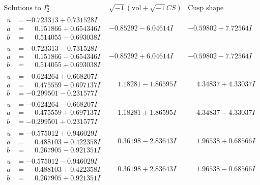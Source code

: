 \documentclass[1p]{elsarticle_modified}
\theoremstyle{definition}
\newcommand{\I}{\sqrt{-1}}
\begin{document}
$$\begin{array}{c|c|c}  
\text{Solutions to }I^u_{2}& \I (\text{vol} + \sqrt{-1}CS) & \text{Cusp shape}\\
 \hline 
\begin{aligned}
u &= -0.723313 + 0.731528 I \\
a &= \phantom{-}0.151866 + 0.654346 I \\
b &= \phantom{-}0.514055 - 0.693038 I\end{aligned}
 & -0.85292 - 6.04614 I & -0.59802 + 7.72564 I \\ \hline\begin{aligned}
u &= -0.723313 - 0.731528 I \\
a &= \phantom{-}0.151866 - 0.654346 I \\
b &= \phantom{-}0.514055 + 0.693038 I\end{aligned}
 & -0.85292 + 6.04614 I & -0.59802 - 7.72564 I \\ \hline\begin{aligned}
u &= -0.624264 + 0.668207 I \\
a &= \phantom{-}0.475559 - 0.697137 I \\
b &= -0.299501 - 0.231577 I\end{aligned}
 & \phantom{-}1.18281 - 1.86595 I & \phantom{-}4.34837 + 4.33037 I \\ \hline\begin{aligned}
u &= -0.624264 - 0.668207 I \\
a &= \phantom{-}0.475559 + 0.697137 I \\
b &= -0.299501 + 0.231577 I\end{aligned}
 & \phantom{-}1.18281 + 1.86595 I & \phantom{-}4.34837 - 4.33037 I \\ \hline\begin{aligned}
u &= -0.575012 + 0.946029 I \\
a &= \phantom{-}0.488103 - 0.422358 I \\
b &= \phantom{-}0.267905 - 0.921351 I\end{aligned}
 & \phantom{-}0.36198 - 2.83643 I & \phantom{-}1.96538 + 0.68566 I \\ \hline\begin{aligned}
u &= -0.575012 - 0.946029 I \\
a &= \phantom{-}0.488103 + 0.422358 I \\
b &= \phantom{-}0.267905 + 0.921351 I\end{aligned}
 & \phantom{-}0.36198 + 2.83643 I & \phantom{-}1.96538 - 0.68566 I \\ \hline\begin{aligned}

\end{aligned}
\end{array}$$
\end{document}
